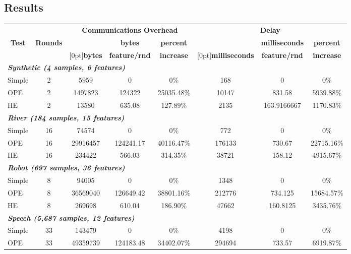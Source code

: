 \subsection{Results}
\label{sec:exres}

\begin{table}
\begin{center}
\begin{tabular}{|l|c|c|c|c|c|c|c|}
\hline
& & \multicolumn{3}{|c|}{\bf Communications Overhead}
& \multicolumn{3}{|c|}{\bf Delay} \\
\cline{3-8}
\multicolumn{1}{|c|}{\bf Test} & {\bf Rounds} & & {\bf bytes} & {\bf percent}
& & {\bf milliseconds} & {\bf percent} \\
& & \raisebox{1.5ex}[0pt]{\bf bytes} & {\bf feature/rnd} & {\bf increase}
& \raisebox{1.5ex}[0pt]{\bf milliseconds} & {\bf feature/rnd} & {\bf increase} \\
\hline
\hline
\multicolumn{8}{|l|}{\bf\it Synthetic ({\it 4 samples, 6 features})} \\
\hline
Simple & 2 & 5959     & 0       & 0\%      & 168   & 0      & 0\% \\
\hline
OPE    & 2 & 1497823  & 124322 & 25035.48\%  & 10147 & 831.58 & 5939.88\%  \\
\hline
HE    & 2 & 13580 & 635.08 & 127.89\% & 2135  & 163.9166667 & 1170.83\%  \\
\hline
\hline  
\multicolumn{8}{|l|}{\bf\it River ({\it 184 samples, 15 features})} \\
\hline
Simple & 16 & 74574 & 0 & 0\% & 772 & 0 & 0\% \\
\hline
OPE & 16 & 29916457 & 124241.17 & 40116.47\% & 176133 & 730.67 & 22715.16\% \\
\hline
HE & 16 & 234422 & 566.03 & 314.35\% & 38721 & 158.12 & 4915.67\% \\
\hline
\hline
\multicolumn{8}{|l|}{\bf\it Robot ({\it 697 samples, 36 features})} \\
\hline
Simple & 8 & 94005 & 0 & 0\% & 1348 & 0 & 0\% \\
\hline
OPE & 8 & 36569040 & 126649.42 & 38801.16\% & 212776 & 734.125 & 15684.57\% \\
\hline
HE & 8 & 269698 & 610.04 & 186.90\% & 47662 & 160.8125 & 3435.76\% \\
\hline
\hline
\multicolumn{8}{|l|}{\bf\it Speech ({\it 5,687 samples, 12 features})} \\
\hline
Simple & 33 & 143479 & 0 & 0\% & 4198 & 0 & 0\% \\
\hline
OPE & 33 & 49359739 & 124183.48 & 34402.07\% & 294694 & 733.57 & 6919.87\% \\

\end{tabular}
\end{center}
\end{table}
